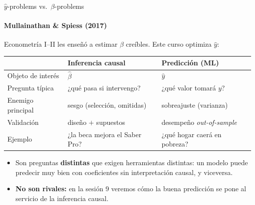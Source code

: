 \documentclass{beamer}
\newcommand{\1}{\mathbb{I}}
\begin{document}
\begin{frame}{$\hat{y}$-problems vs.\ $\beta$-problems}
\framesubtitle{Mullainathan \& Spiess (2017)}
\small
Econometría I--II les enseñó a estimar $\beta$ creíbles. Este curso optimiza $\hat{y}$:

\vspace{0.2cm}
\begin{center}
\footnotesize
\begin{tabular}{lll}
\hline
 & \textbf{Inferencia causal} & \textbf{Predicción (ML)} \\
\hline
Objeto de interés & $\hat{\beta}$ & $\hat{y}$ \\
Pregunta típica & ¿qué pasa si intervengo? & ¿qué valor tomará $y$? \\
Enemigo principal & sesgo (selección, omitidas) & sobreajuste (varianza) \\
Validación & diseño $+$ supuestos & desempeño \emph{out-of-sample} \\
Ejemplo & ¿la beca mejora el Saber Pro? & ¿qué hogar caerá en pobreza? \\
\hline
\end{tabular}
\end{center}
\pause

\vspace{0.3cm}
\begin{itemize}\itemsep3pt
  \item Son preguntas \textbf{distintas} que exigen herramientas distintas: un modelo puede predecir muy bien con coeficientes sin interpretación causal, y viceversa.
  \item \textbf{No son rivales:} en la sesión 9 veremos cómo la buena predicción se pone al servicio de la inferencia causal.
\end{itemize}
\end{frame}
\end{document}
